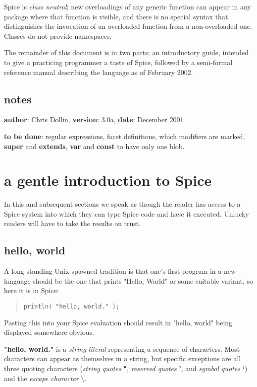 \documentclass{report}
\begin{document}
Spice is {\em class neutral}; new overloadings of any generic function can appear
in any package where that function is visible, and there is no special syntax
that distinguishes the invocation of an overloaded function from a
non-overloaded one. Classes do not provide namespaces.

The remainder of this document is in two parts; an introductory guide,
intended to give a practicing programmer a taste of Spice, followed by a
semi-formal reference manual describing the language as of February 2002.

\section{notes}


{\bf author}: Chris Dollin, {\bf version}: 3.0a, {\bf date}: December 2001

{\bf to be done}: regular expressions, facet definitions, which modifiers are
marked, {\bf super} and {\bf extends}, {\bf var} and {\bf const} to have only one blob.\chapter{a gentle introduction to Spice}


In this and subsequent sections we speak as though the reader has access to a
Spice system into which they can type Spice code and have it executed. Unlucky
readers will have to take the results on trust.

\section{hello, world}


A long-standing Unix-spawned tradition is that one's first program in a new
language should be the one that prints "Hello, World" or some suitable
variant, so here it is in Spice:

\begin{quote}
\begin{verbatim}
println( "hello, world." );
\end{verbatim}
\end{quote}
Pasting this into your Spice evaluation should result in "hello, world" being
displayed somewhere obvious.

{\bf "hello, world."} is a {\em string literal} representing a sequence of characters.
Most characters can appear as themselves in a string, but specific exceptions
are all three quoting characters ({\em string quotes} {\bf "}, {\em reserved quotes} {\bf '},
and {\em symbol quotes} {\bf `}) and the {\em escape character} $\setminus$.
\end{document}

